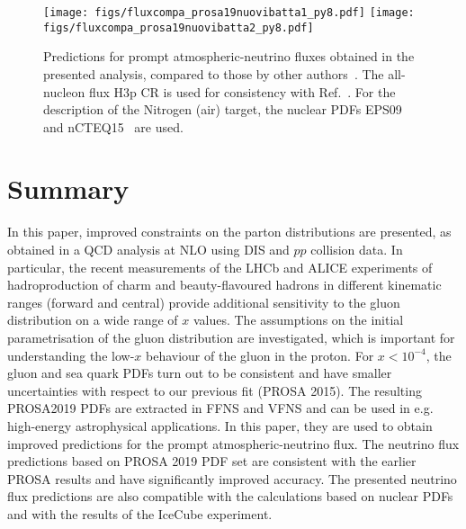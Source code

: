 \begin{figure}
\centering
    \texttt{[image: figs/fluxcompa\_prosa19nuovibatta1\_py8.pdf]}
    \texttt{[image: figs/fluxcompa\_prosa19nuovibatta2\_py8.pdf]}
  \caption{\label{fig5prompt} Predictions for prompt atmospheric-neutrino fluxes obtained in the presented analysis, compared to those by other authors~\cite{Bhattacharya:2016jce}. The all-nucleon flux H3p CR is used for consistency with Ref.~\cite{Bhattacharya:2016jce}. 
For the description of the Nitrogen (air) target, the nuclear PDFs EPS09~\cite{Eskola:2009uj} and nCTEQ15~\cite{Kovarik:2015cma} are used.}
\end{figure}

%
%
%


\section{Summary}
\label{sec:summary}

In this paper, improved constraints on the parton distributions are presented, as obtained in a QCD analysis at NLO using DIS and $pp$ collision data. In particular, the recent measurements of the LHCb and ALICE experiments of hadroproduction of charm and beauty-flavoured hadrons in different kinematic ranges (forward and central) provide additional sensitivity to the gluon distribution on a wide range of $x$ values. The assumptions on the initial parametrisation of the gluon distribution are investigated, which is important for understanding the low-$x$ behaviour of the gluon in the proton. For $x < 10^{-4}$, the gluon and sea quark PDFs turn out to be consistent and have smaller uncertainties with respect to our previous fit (PROSA 2015). The resulting PROSA2019 PDFs are extracted in FFNS and VFNS and can be used in e.g. high-energy astrophysical applications. In this paper, they  
 are used to obtain improved predictions for the prompt atmospheric-neutrino flux.
The neutrino flux predictions based on PROSA 2019 PDF set are consistent with the earlier PROSA results and have significantly improved accuracy. 
The presented neutrino flux predictions are also compatible with the calculations based on nuclear PDFs and with the results of the IceCube experiment. 
